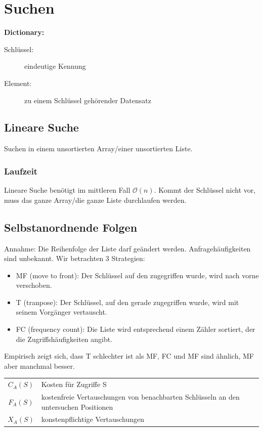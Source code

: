 \documentclass{scrartcl}
\begin{document}

\section{Suchen}

\begin{shaded}
\textbf{Dictionary:} \\
\begin{description}
	\item[Schlüssel:] eindeutige Kennung
	\item[Element:] zu einem Schlüssel gehörender Datensatz
\end{description}
\end{shaded}
\subsection{Lineare Suche}
Suchen in einem unsortierten Array/einer unsortierten Liste.
\subsubsection{Laufzeit}
Lineare Suche benötigt im mittleren Fall $\mathcal{O}(n)$. {\tiny Kommt der Schlüssel nicht vor, muss das ganze Array/die ganze Liste durchlaufen werden.}
\subsection{Selbstanordnende Folgen}
Annahme: Die Reihenfolge der Liste darf geändert werden. Anfragehäufigkeiten sind unbekannt. Wir betrachten $3$ Strategien:
\begin{itemize}
	\item MF (move to front): Der Schlüssel auf den zugegriffen wurde, wird nach vorne verschoben.
	\item T (tranpose): Der Schlüssel, auf den gerade zugegriffen wurde, wird mit seinem Vorgänger vertauscht.
	\item FC (frequency count): Die Liste wird entsprechend einem Zähler sortiert, der die Zugriffshäufigkeiten angibt.
\end{itemize}
Empirisch zeigt sich, dass T schlechter ist als MF, FC und MF sind ähnlich, MF aber manchmal besser.\\
\begin{tabular}{cp{450px}}
 $C_A(S)$ & Kosten für Zugriffe S \\
 $F_A(S)$ & kostenfreie Vertauschungen von benachbarten Schlüsseln an den untersuchen Positionen \\
 $X_A(S)$ & konstenpflichtige Vertauschungen \\
\end{tabular}
\end{document}
